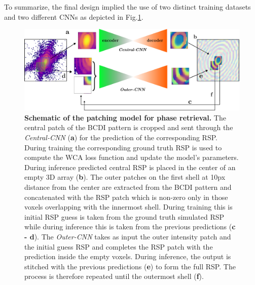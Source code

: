 To summarize, the final design implied the use of two distinct training datasets and two different CNNs as depicted in 
Fig.\ref{fig:2models}.

\begin{figure}[H]
    \centering
    \includegraphics[width=\textwidth]{figures/Phasing/2models_patching.pdf}
    \caption{\textbf{Schematic of the patching model for phase retrieval.} The central patch of the 
    BCDI pattern is cropped and sent through the \textit{Central-CNN} (\textbf{a}) for the prediction of the corresponding 
    RSP. During training the corresponding ground truth RSP is used to compute the WCA loss function and update the model's
    parameters. During inference predicted central RSP is placed in the center of an empty 3D array (\textbf{b}). The outer 
    patches on the first shell at 10px distance from the center are extracted from the BCDI pattern and concatenated 
    with the RSP patch which is non-zero only in those voxels overlapping with the innermost shell. During training 
    this is initial RSP guess is taken from the ground truth simulated RSP while during inference this is taken from the 
    previous predictions (\textbf{c - d}). The \textit{Outer-CNN} takes as input the outer intensity patch and the initial 
    guess RSP and completes the RSP patch with the prediction inside the empty voxels. During inference, the output is 
    stitched with the previous predictions (\textbf{e}) to form the full RSP. The process is therefore repeated until the 
    outermost shell (\textbf{f}). }
    \label{fig:2models}

\end{figure}

